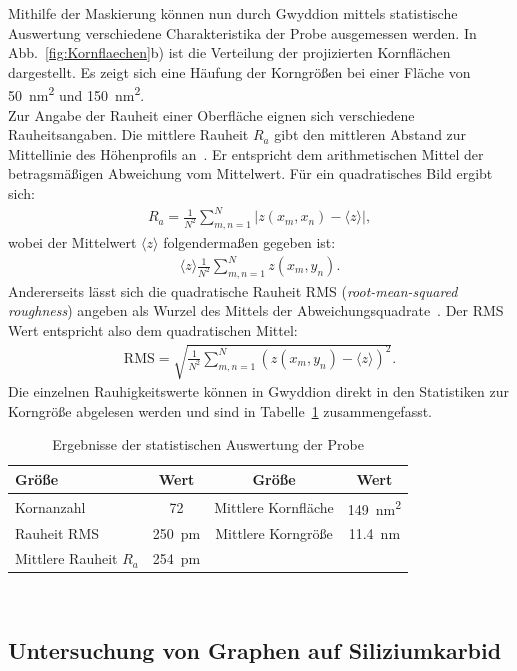 \documentclass[a4paper,twoside,final]{article}
\begin{document}
Mithilfe der Maskierung können nun durch Gwyddion mittels statistische Auswertung verschiedene Charakteristika der Probe ausgemessen werden. In Abb.~\ref{fig:Kornflaechen}b) ist die Verteilung der projizierten Kornflächen dargestellt. Es zeigt sich eine Häufung der Korngrößen bei einer Fläche von \SI{50}{\nano\metre\squared} und \SI{150}{\nano\metre\squared}.\\
Zur Angabe der Rauheit einer Oberfläche eignen sich verschiedene Rauheitsangaben. Die mittlere Rauheit $R_a$ gibt den mittleren Abstand zur Mittellinie des Höhenprofils an~\cite{Rauheit}. Er entspricht dem arithmetischen Mittel der betragsmäßigen Abweichung vom Mittelwert. Für ein quadratisches Bild ergibt sich:
\begin{align}
  R_a = \frac{1}{N^2} \sum_{m,n = 1}^N |z(x_m, x_n) - \langle z \rangle|,
\end{align}
wobei der Mittelwert $\langle z \rangle$ folgendermaßen gegeben ist:
\begin{align}
  \langle z \rangle \frac{1}{N^2} \sum_{m,n = 1}^N z(x_m, y_n).
\end{align}
Andererseits lässt sich die quadratische Rauheit RMS (\textit{root-mean-squared roughness}) angeben als Wurzel des Mittels der Abweichungsquadrate~\cite{Rauheit}.
Der RMS Wert entspricht also dem quadratischen Mittel:
\begin{align}
  \text{RMS} = \sqrt{\frac{1}{N^2}\sum_{m,n = 1}^N (z(x_m, y_n)-\langle z\rangle)^2}.
\end{align}
Die einzelnen Rauhigkeitswerte können in Gwyddion direkt in den Statistiken zur Korngröße abgelesen werden und sind in Tabelle~\ref{tab:ErgebnisseGoldprobe} zusammengefasst.
\begin{table}[ht]
	\centering
	\caption{Ergebnisse der statistischen Auswertung der Probe}
	\label{tab:ErgebnisseGoldprobe}
  \begin{tabular}{l c c c}
   \toprule
   Größe & Wert & Größe & Wert\\
   \midrule
   Kornanzahl & 72 & Mittlere Kornfläche & \SI{149}{\nano\metre\squared}\\
   Rauheit RMS & \SI{250}{\pico\metre} & Mittlere Korngröße & \SI{11.4}{\nano\metre}\\
   Mittlere Rauheit $R_a$ & \SI{254}{\pico\metre} & &\\
   \bottomrule
  \end{tabular}
\end{table}\\

\subsection{Untersuchung von Graphen auf Siliziumkarbid}
\end{document}

